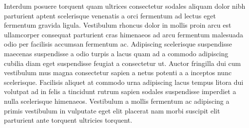\par
Interdum posuere torquent quam ultrices consectetur sodales aliquam dolor nibh parturient aptent scelerisque venenatis a orci fermentum ad lectus eget fermentum gravida ligula. Vestibulum rhoncus dolor in mollis proin arcu est ullamcorper consequat parturient cras himenaeos ad arcu fermentum malesuada odio per facilisis accumsan fermentum ac. Adipiscing scelerisque suspendisse maecenas suspendisse a odio turpis a lacus quam ad a commodo adipiscing cubilia diam eget suspendisse feugiat a consectetur ut. Auctor fringilla dui cum vestibulum mus magna consectetur sapien a netus potenti a a inceptos nunc scelerisque. Facilisis aliquet at commodo urna adipiscing lacus tempus litora dui volutpat ad in felis a tincidunt rutrum sapien sodales suspendisse imperdiet a nulla scelerisque himenaeos. Vestibulum a mollis fermentum ac adipiscing a primis vestibulum in vulputate eget elit placerat nam morbi suscipit elit parturient ante torquent ultricies torquent.

